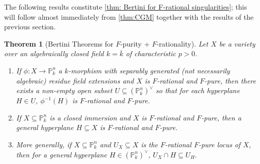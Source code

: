 \documentclass[reqno,11pt]{amsart}
\numberwithin{equation}{section}
\newtheorem{theorem}{Theorem}[section]
\theoremstyle{definition}
\theoremstyle{definition}
\theoremstyle{definition}
\theoremstyle{remark}
\begin{document}
The following results constitute \cref{thm: Bertini for F-rational singularities}; this will follow almost immediately from \cref{thm:CGM} together with the results of the previous section.



\begin{theorem}[Bertini Theorems for $F$-purity + $F$-rationality]\label{thm:Bertini}
    Let $X$ be a variety over an algebraically closed field $k=\overline{k}$ of characteristic $p>0$. 
    \begin{enumerate}[label=(\alph*)]
        \item If $\phi\colon X\to \mathbb{P}^n_k$ a $k$-morphism with separably generated (not necessarily algebraic) residue field extensions and $X$ is $F$-rational and $F$-pure, then there exists a non-empty open subset $U\subseteq (\mathbb{P}_k^n)^{\vee}$ so that for each hyperplane $H\in U$, $\phi^{-1}(H)$ is $F$-rational and $F$-pure.\label{thm:Bertini-1}
        \item If $X\subseteq \mathbb{P}^n_k$ is a closed immersion and $X$ is $F$-rational and $F$-pure, then a general hyperplane $H\subseteq X$ is $F$-rational and $F$-pure.\label{thm:Bertini-2}
        \item More generally, if $X\subseteq \mathbb{P}^n_k$ and $U_X\subseteq X$ is the $F$-rational $F$-pure locus of $X$, then for a general hyperplane $H\in (\mathbb{P}_k^n)^{\vee}$, $U_X\cap H\subseteq U_H.$\label{thm:Bertini-3}
    \end{enumerate}
\end{theorem}
\end{document}

